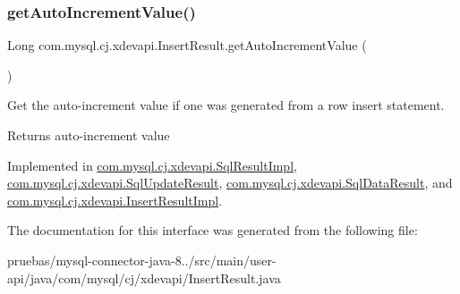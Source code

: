 \subsubsection{\texorpdfstring{get\+Auto\+Increment\+Value()}{getAutoIncrementValue()}}
{\footnotesize\ttfamily Long com.\+mysql.\+cj.\+xdevapi.\+Insert\+Result.\+get\+Auto\+Increment\+Value (\begin{DoxyParamCaption}{ }\end{DoxyParamCaption})}

Get the auto-\/increment value if one was generated from a row insert statement.

\begin{DoxyReturn}{Returns}
auto-\/increment value 
\end{DoxyReturn}


Implemented in \mbox{\hyperlink{classcom_1_1mysql_1_1cj_1_1xdevapi_1_1_sql_result_impl_ac1730d1c9d94a55bd5519e803be617e4}{com.\+mysql.\+cj.\+xdevapi.\+Sql\+Result\+Impl}}, \mbox{\hyperlink{classcom_1_1mysql_1_1cj_1_1xdevapi_1_1_sql_update_result_a7c839bddddabb36231503575810e8a1d}{com.\+mysql.\+cj.\+xdevapi.\+Sql\+Update\+Result}}, \mbox{\hyperlink{classcom_1_1mysql_1_1cj_1_1xdevapi_1_1_sql_data_result_aa6d3e3de7bb565c7086d71b0242c77d9}{com.\+mysql.\+cj.\+xdevapi.\+Sql\+Data\+Result}}, and \mbox{\hyperlink{classcom_1_1mysql_1_1cj_1_1xdevapi_1_1_insert_result_impl_a0849fb03ac4d7da386014ce3647e00ea}{com.\+mysql.\+cj.\+xdevapi.\+Insert\+Result\+Impl}}.



The documentation for this interface was generated from the following file\+:\begin{DoxyCompactItemize}
\item 
pruebas/mysql-\/connector-\/java-\/8../src/main/user-\/api/java/com/mysql/cj/xdevapi/Insert\+Result.\+java\end{DoxyCompactItemize}
